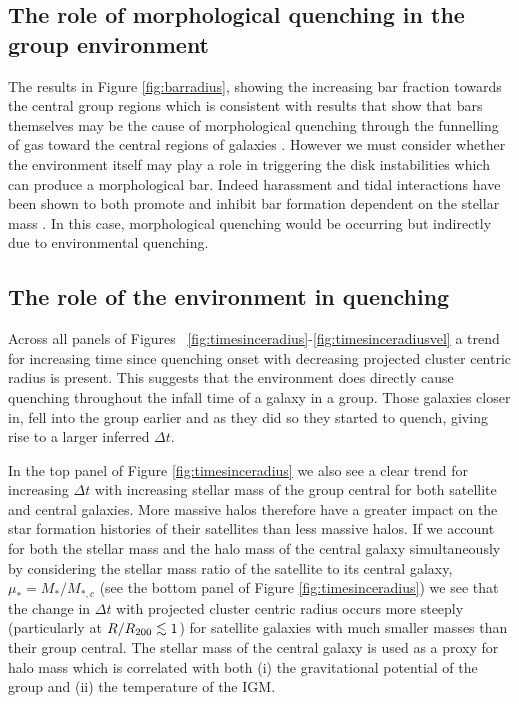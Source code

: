 \documentclass[useAMS,usenatbib]{mn2e}
\def\lesssim{\mathrel{\hbox{\rlap{\hbox{\lower3pt\hbox{$\sim$}}}\hbox{\raise2pt\hbox{$<$}}}}}
\begin{document}
\subsection{The role of morphological quenching in the group environment}\label{sec:rolemorphenv}

The results in Figure \ref{fig:barradius}, showing the increasing bar fraction towards the central group regions which is consistent with results that show that bars themselves may be the cause of morphological quenching through the funnelling of gas toward the central regions of galaxies \citep{athanassoula92b, sheth05,masters10c}. However we must consider whether the environment itself may play a role in triggering the disk instabilities which can produce a morphological bar. Indeed harassment and tidal interactions have been shown to both promote and inhibit bar formation dependent on the stellar mass \citep{noguchi88, moore96, skibba12}.  In this case, morphological quenching would be occurring but indirectly due to environmental quenching. 

\subsection{The role of the environment in quenching}\label{sec:roleenv}

Across all panels of Figures ~\ref{fig:timesinceradius}-\ref{fig:timesinceradiusvel} a trend for increasing time since quenching onset with decreasing projected cluster centric radius is present. This suggests that the environment does directly cause quenching throughout the infall time of a galaxy in a group. Those galaxies closer in, fell into the group earlier and as they did so they started to quench, giving rise to a larger inferred $\Delta t$.

In the top panel of Figure \ref{fig:timesinceradius} we also see a clear trend for increasing $\Delta t$ with increasing stellar mass of the group central for both satellite and central galaxies. More massive halos therefore have a greater impact on the star formation histories of their satellites than less massive halos.  If we account for both the stellar mass and the halo mass of the central galaxy simultaneously by considering the stellar mass ratio of the satellite to its central galaxy, $\mu_* = M_*/M_{*,c}$ (see the bottom panel of Figure \ref{fig:timesinceradius}) we see that the change in $\Delta t $ with projected cluster centric radius occurs more steeply (particularly at $R/R_{200} \lesssim 1$) for satellite galaxies with much smaller masses than their group central. The stellar mass of the central galaxy is used as a proxy for halo mass which is correlated with both (i) the gravitational potential of the group and (ii) the temperature of the IGM.
\end{document}
